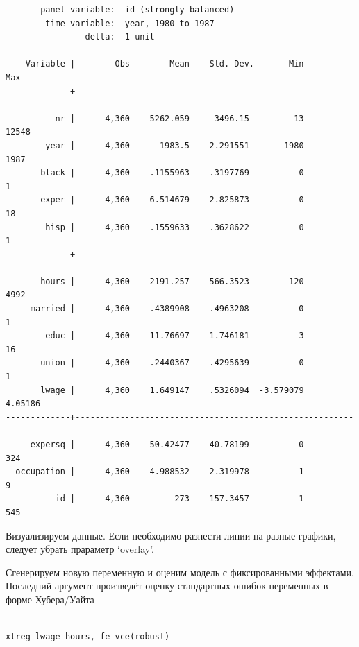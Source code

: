 \documentclass[]{book}
\begin{document}
\begin{verbatim}
       panel variable:  id (strongly balanced)
        time variable:  year, 1980 to 1987
                delta:  1 unit

    Variable |        Obs        Mean    Std. Dev.       Min        Max
-------------+---------------------------------------------------------
          nr |      4,360    5262.059     3496.15         13      12548
        year |      4,360      1983.5    2.291551       1980       1987
       black |      4,360    .1155963    .3197769          0          1
       exper |      4,360    6.514679    2.825873          0         18
        hisp |      4,360    .1559633    .3628622          0          1
-------------+---------------------------------------------------------
       hours |      4,360    2191.257    566.3523        120       4992
     married |      4,360    .4389908    .4963208          0          1
        educ |      4,360    11.76697    1.746181          3         16
       union |      4,360    .2440367    .4295639          0          1
       lwage |      4,360    1.649147    .5326094  -3.579079    4.05186
-------------+---------------------------------------------------------
     expersq |      4,360    50.42477    40.78199          0        324
  occupation |      4,360    4.988532    2.319978          1          9
          id |      4,360         273    157.3457          1        545
\end{verbatim}

Визуализируем данные. Если необходимо разнести линии на разные графики, следует убрать прараметр `overlay'.

Сгенерируем новую переменную и оценим модель с фиксированными эффектами. Последний аргумент произведёт оценку стандартных ошибок переменных в форме Хубера/Уайта

\begin{verbatim}

xtreg lwage hours, fe vce(robust)
\end{verbatim}
\end{document}
